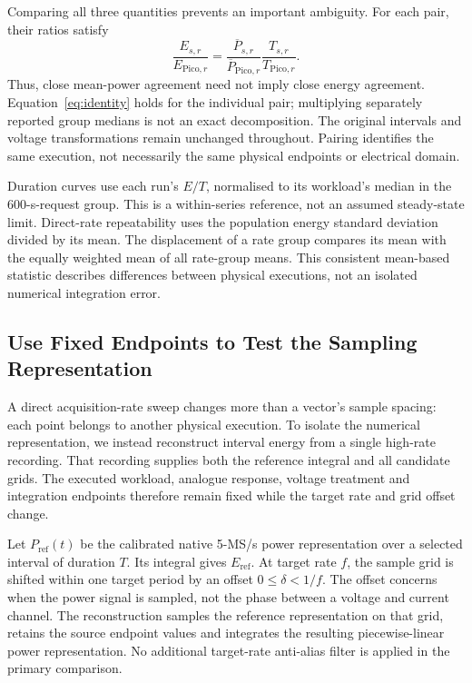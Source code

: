 Comparing all three quantities prevents an important ambiguity. For each pair, their ratios satisfy
\begin{equation}
\frac{E_{s,r}}{E_{\mathrm{Pico},r}}=
\frac{\overline P_{s,r}}{\overline P_{\mathrm{Pico},r}}
\frac{T_{s,r}}{T_{\mathrm{Pico},r}}.
\label{eq:identity}
\end{equation}
Thus, close mean-power agreement need not imply close energy agreement. Equation~\eqref{eq:identity} holds for the individual pair; multiplying separately reported group medians is not an exact decomposition. The original intervals and voltage transformations remain unchanged throughout. Pairing identifies the same execution, not necessarily the same physical endpoints or electrical domain.

Duration curves use each run's $E/T$, normalised to its workload's median in the 600-s-request group. This is a within-series reference, not an assumed steady-state limit. Direct-rate repeatability uses the population energy standard deviation divided by its mean. The displacement of a rate group compares its mean with the equally weighted mean of all rate-group means. This consistent mean-based statistic describes differences between physical executions, not an isolated numerical integration error.


\subsection{Use Fixed Endpoints to Test the Sampling Representation}
\label{sec:reconstruction-method}
A direct acquisition-rate sweep changes more than a vector's sample spacing: each point belongs to another physical execution. To isolate the numerical representation, we instead reconstruct interval energy from a single high-rate recording. That recording supplies both the reference integral and all candidate grids. The executed workload, analogue response, voltage treatment and integration endpoints therefore remain fixed while the target rate and grid offset change.

Let $P_{\mathrm{ref}}(t)$ be the calibrated native 5-MS/s power representation over a selected interval of duration $T$. Its integral gives $E_{\mathrm{ref}}$. At target rate $f$, the sample grid is shifted within one target period by an offset $0\leq\delta<1/f$. The offset concerns when the power signal is sampled, not the phase between a voltage and current channel. The reconstruction samples the reference representation on that grid, retains the source endpoint values and integrates the resulting piecewise-linear power representation. No additional target-rate anti-alias filter is applied in the primary comparison.

